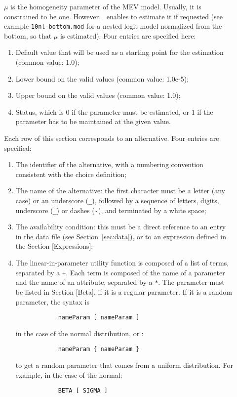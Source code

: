 \documentclass[12pt]{memoir}
\begin{document}
\begin{description}
   \item[] $\mu$ is the homogeneity parameter of the MEV
      model. Usually, it is constrained to be one. However, \BIOGEME\  enables to
      estimate it if requested (see example \verb+10nl-bottom.mod+ for a nested logit model normalized from the bottom, so that $\mu$ is estimated). Four entries are specified here:
      \begin{enumerate}
         \item Default value that will be used as a starting point for the estimation (common value: 1.0);
         \item Lower bound on the valid values (common value: 1.0e-5);
         \item Upper bound on the valid values (common value: 1.0);
         \item Status, which is 0 if the parameter must be estimated, or 1 if the parameter 
            has to be maintained at the given value. 
      \end{enumerate}

   \item[] Each row of this section corresponds to an
      alternative. Four entries are specified:
     \begin{enumerate}
      \item The identifier of the alternative, with a numbering convention
         consistent with the choice definition;
      \item The name of the alternative:  the first character must be a letter (any case) or an 
         underscore (\verb+_+), followed by a sequence of letters, digits, underscore (\verb+_+)
         or dashes (\verb+-+), and terminated by a white space;
      \item The availability condition: this must be a direct reference to an entry
         in the data file (see Section~\ref{sec:data}), or to an expression defined in the
         Section [Expressions];
      \item The linear-in-parameter utility function is composed of a list of terms,
         separated by a \verb-+-. Each term is composed of the name of a
         parameter and the name of an attribute,
         separated by a \verb+*+. The parameter must be listed in
         Section [Beta], if it is a regular parameter. If it
         is a random parameter, the syntax is
{\footnotesize
         \begin{verbatim}
            nameParam [ nameParam ] 
         \end{verbatim}
}
         in the case of the normal distribution, or :
{\footnotesize
         \begin{verbatim}
            nameParam { nameParam }
         \end{verbatim}
}
         to get a random parameter that comes from a uniform distribution.  For example, 
         in the case of the normal:
{\footnotesize
         \begin{verbatim}
            BETA [ SIGMA ] 
         \end{verbatim}
}


\end{enumerate}
\end{description}
\end{document}
